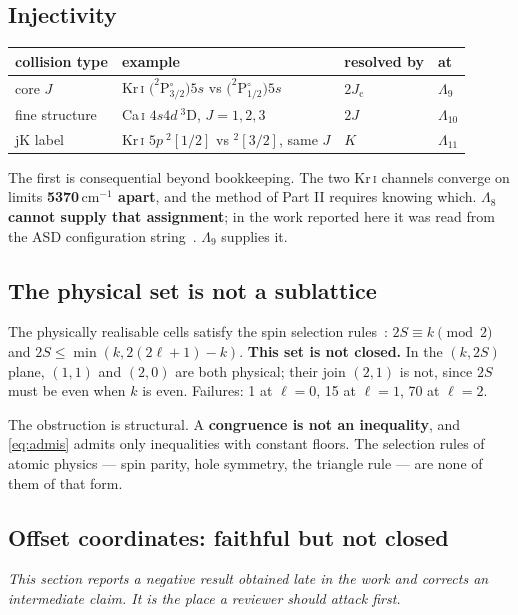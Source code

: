\documentclass[11pt,a4paper]{article}
\theoremstyle{definition}
\newcommand{\Le}{\ensuremath{\Lambda_{8}}}
\newcommand{\cmi}{\,\ensuremath{\mathrm{cm}^{-1}}}
\newcommand{\Jc}{\ensuremath{J_{\mathrm{c}}}}
\begin{document}
\subsection{Injectivity}
\begin{center}\small
\begin{tabular}{@{}llll@{}}
\toprule
collision type & example & resolved by & at\\
\midrule
core $J$       & Kr\,\textsc{i} $(^2$P$^{\circ}_{3/2})5s$ vs
                 $(^2$P$^{\circ}_{1/2})5s$ & $2\Jc$ & $\Lambda_{9}$\\
fine structure & Ca\,\textsc{i} $4s4d\ ^3$D, $J=1,2,3$ & $2J$ & $\Lambda_{10}$\\
jK label       & Kr\,\textsc{i} $5p\ ^2[1/2]$ vs $^2[3/2]$, same $J$
               & $K$ & $\Lambda_{11}$\\
\bottomrule
\end{tabular}
\end{center}
\vspace{2mm}

The first is consequential beyond bookkeeping. The two Kr\,\textsc{i} channels
converge on limits \textbf{5370\cmi{} apart}, and the method of Part II requires
knowing which. \textbf{\Le{} cannot supply that assignment}; in the work
reported here it was read from the ASD configuration string~\cite{nistasd}.
$\Lambda_{9}$ supplies it.

\subsection{The physical set is not a sublattice}
\label{sec:notsub}
The physically realisable cells satisfy the spin selection
rules~\cite{condonshortley}: $2S\equiv k \pmod 2$ and
$2S\le\min(k,2(2\ell+1)-k)$. \textbf{This set is not closed.} In the $(k,2S)$
plane, $(1,1)$ and $(2,0)$ are both physical; their join $(2,1)$ is not, since
$2S$ must be even when $k$ is even. Failures: 1 at $\ell=0$, 15 at $\ell=1$, 70
at $\ell=2$.

The obstruction is structural. A \textbf{congruence is not an inequality}, and
\eqref{eq:admis} admits only inequalities with constant floors. The selection
rules of atomic physics --- spin parity, hole symmetry, the triangle rule ---
are none of them of that form.

\subsection{Offset coordinates: faithful but not closed}
\label{sec:offset}
\emph{This section reports a negative result obtained late in the work and
corrects an intermediate claim. It is the place a reviewer should attack first.}
\end{document}
